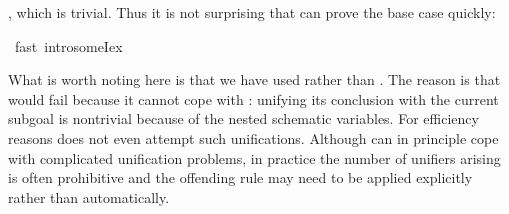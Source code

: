 \begin{isabellebody}
\begin{isamarkuptxt}
, which is trivial. Thus it is not surprising that
 can prove the base case quickly:%
\end{isamarkuptxt}%
\ fast\ intro{\isacharcolon}someI{}{\isacharunderscore}ex{\isacharparenright}%
\begin{isamarkuptxt}%
\noindent
What is worth noting here is that we have used  rather than .
The reason is that  would fail because it cannot cope with :
unifying its conclusion with the current subgoal is nontrivial because of the nested schematic
variables. For efficiency reasons  does not even attempt such unifications.
Although  can in principle cope with complicated unification problems, in practice
the number of unifiers arising is often prohibitive and the offending rule may need to be applied
explicitly rather than automatically.


\end{isamarkuptxt}
\end{isabellebody}
